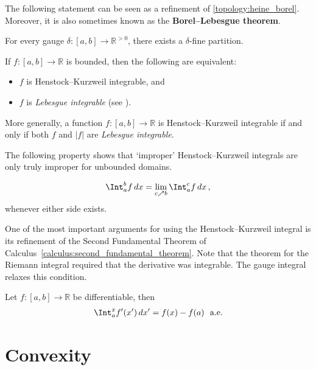     The following statement can be seen as a refinement of \cref{topology:heine_borel}. Moreover, it is also sometimes known as the \textbf{Borel--Lebesgue theorem}.
    \begin{property}[Cousin]
        For every gauge $\delta:[a,b]\rightarrow\mathbb{R}^{>0}$, there exists a $\delta$-fine partition. 
    \end{property}

    \begin{property}[Integrability]
        If $f:[a,b]\rightarrow\mathbb{R}$ is bounded, then the following are equivalent:
        \begin{itemize}
            \item $f$ is Henstock--Kurzweil integrable, and
            \item $f$ is \textit{Lebesgue integrable} (see ).
        \end{itemize}
        More generally, a function $f:[a,b]\rightarrow\mathbb{R}$ is Henstock--Kurzweil integrable if and only if both $f$ and $|f|$ are \textit{Lebesgue integrable}.
    \end{property}

    The following property shows that `improper' Henstock--Kurzweil integrals are only truly improper for unbounded domains.
    \begin{property}[Hake]
        \begin{gather}
            \Int_a^bf\,dx = \lim_{c\nearrow b}\Int_a^cf\,dx\,,
        \end{gather}
        whenever either side exists.
    \end{property}

    One of the most important arguments for using the Henstock--Kurzweil integral is its refinement of the Second Fundamental Theorem of Calculus~\ref{calculus:second_fundamental_theorem}. Note that the theorem for the Riemann integral required that the derivative was integrable. The gauge integral relaxes this condition.
    \begin{theorem}
        Let $f:[a,b]\rightarrow\mathbb{R}$ be differentiable, then
        \begin{gather}
            \Int_a^xf'(x')\,dx' = f(x)-f(a)\text{\ \ a.e.}
        \end{gather}
    \end{theorem}

\section{Convexity}

